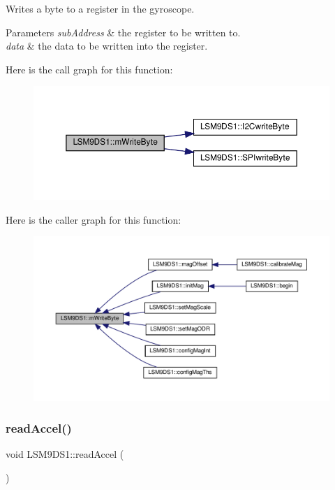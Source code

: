 Writes a byte to a register in the gyroscope. 


\begin{DoxyParams}{Parameters}
{\em sub\+Address} & the register to be written to. \\
\hline
{\em data} & the data to be written into the register. \\
\hline
\end{DoxyParams}
Here is the call graph for this function\+:\nopagebreak
\begin{figure}[H]
\begin{center}
\leavevmode
\includegraphics[width=350pt]{classLSM9DS1_afc171c924102c97fa1d88fa7f48bd167_cgraph}
\end{center}
\end{figure}
Here is the caller graph for this function\+:\nopagebreak
\begin{figure}[H]
\begin{center}
\leavevmode
\includegraphics[width=350pt]{classLSM9DS1_afc171c924102c97fa1d88fa7f48bd167_icgraph}
\end{center}
\end{figure}
\mbox{\label{classLSM9DS1_a9953684a1ff652a7d3a4d91e72bccaa1}} 
\subsubsection{\texorpdfstring{read\+Accel()}{readAccel()}\hspace{0.1cm}{\footnotesize\ttfamily [1/2]}}
{\footnotesize\ttfamily void L\+S\+M9\+D\+S1\+::read\+Accel (\begin{DoxyParamCaption}{ }\end{DoxyParamCaption})}



